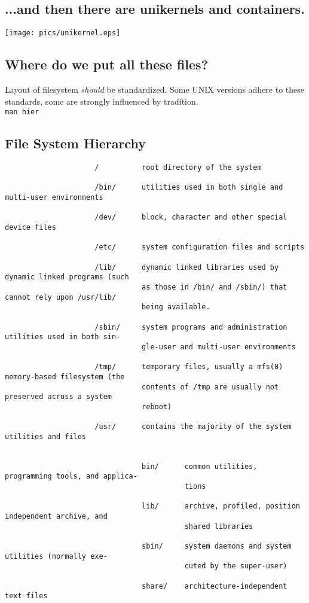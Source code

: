 \documentclass[xga]{xdvislides}
\begin{document}
\subsection{...and then there are unikernels and containers.}
\vfill
\begin{center}
	\texttt{[image: pics/unikernel.eps]}
\end{center}
\vfill

\subsection{Where do we put all these files?}
Layout of filesystem {\em should} be standardized.  Some UNIX versions adhere
to these standards, some are strongly influenced by tradition.
\\

{\tt man hier}

\subsection{File System Hierarchy}
\small
\begin{verbatim}
                     /          root directory of the system

                     /bin/      utilities used in both single and multi-user environments

                     /dev/      block, character and other special device files

                     /etc/      system configuration files and scripts

                     /lib/      dynamic linked libraries used by dynamic linked programs (such
                                as those in /bin/ and /sbin/) that cannot rely upon /usr/lib/
                                being available.

                     /sbin/     system programs and administration utilities used in both sin-
                                gle-user and multi-user environments

                     /tmp/      temporary files, usually a mfs(8) memory-based filesystem (the
                                contents of /tmp are usually not preserved across a system
                                reboot)

                     /usr/      contains the majority of the system utilities and files


                                bin/      common utilities, programming tools, and applica-
                                          tions

                                lib/      archive, profiled, position independent archive, and
                                          shared libraries

                                sbin/     system daemons and system utilities (normally exe-
                                          cuted by the super-user)

                                share/    architecture-independent text files
\end{verbatim}
\Normalsize
\end{document}
